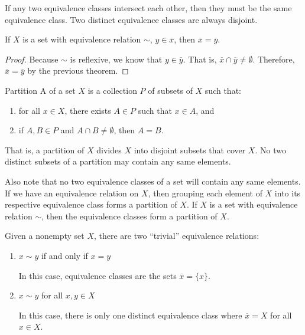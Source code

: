 \documentclass[letterpaper,12pt]{report}
\begin{document}
If any two equivalence classes intersect each other, then they must be the same equivalence class. Two distinct equivalence classes are always disjoint.

\begin{exbox}{}{}
    If $X$ is a set with equivalence relation $\sim$, $y \in \overline{x}$, then $\overline{x} = \overline{y}$.
    \tcblower
    \begin{proof}
        Because $\sim$ is reflexive, we know that $y \in \overline{y}$. That is, $\overline{x} \cap \overline{y} \neq \emptyset$. Therefore, $\overline{x} = \overline{y}$ by the previous theorem.
    \end{proof}
\end{exbox}

\begin{dfnbox}{Partition}{}
    A  of a set $X$ is a collection $P$ of subsets of $X$ such that:
    \begin{enumerate}
        \item for all $x \in X$, there exists $A \in P$ such that $x \in A$, and
        \item if $A, B \in P$ and $A \cap B \neq \emptyset$, then $A = B$.
    \end{enumerate}
\end{dfnbox}

That is, a partition of $X$ divides $X$ into disjoint subsets that cover $X$. No two distinct subsets of a partition may contain any same elements.

Also note that no two equivalence classes of a set will contain any same elements. If we have an equivalence relation on $X$, then grouping each element of $X$ into its respective equivalence class forms a partition of $X$. If $X$ is a set with equivalence relation $\sim$, then the equivalence classes form a partition of $X$.

Given a nonempty set $X$, there are two ``trivial'' equivalence relations:
\begin{enumerate}
    \item $x \sim y$ if and only if $x = y$

    In this case, equivalence classes are the sets $\overline{x} = \{x\}$.
    \item $x \sim y$ for all $x,y \in X$

    In this case, there is only one distinct equivalence class where $\overline{x} = X$ for all $x \in X$.
\end{enumerate}
\end{document}
